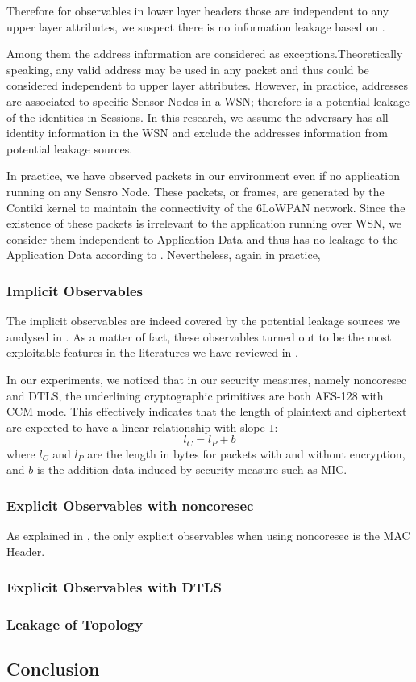 Therefore for observables in lower layer headers those are independent to any upper layer attributes, we suspect there is no information leakage based on .

Among them the address information are considered as exceptions.Theoretically speaking, any valid address may be used in any packet and thus could be considered independent to upper layer attributes. However, in practice, addresses are associated to specific Sensor Nodes in a WSN; therefore is a potential leakage of the identities in Sessions. In this research, we assume the adversary has all identity information in the WSN and exclude the addresses information from potential leakage sources.

In practice, we have observed packets in our environment even if no application running on any Sensro Node. These packets, or frames, are generated by the Contiki kernel to maintain the connectivity of the 6LoWPAN network. Since the existence of these packets is irrelevant to the application running over WSN, we consider them independent to Application Data and thus has no leakage to the Application Data according to . Nevertheless, again in practice, 

\subsubsection{Implicit Observables}

The implicit observables are indeed covered by the potential leakage sources we analysed in . As a matter of fact, these observables turned out to be the most exploitable features in the literatures we have reviewed in .

In our experiments, we noticed that in our security measures, namely noncoresec and DTLS, the underlining cryptographic primitives are both AES-128 with CCM mode. This effectively indicates that the length of plaintext and ciphertext are expected to have a linear relationship with slope $1$:
\begin{equation}
	l_{C} = l_{P} + b
\end{equation}
where $l_{C}$ and $l_{P}$ are the length in bytes for packets with and without encryption, and $b$ is the addition data induced by security measure such as MIC. 

\subsubsection{Explicit Observables with noncoresec}

As explained in , the only explicit observables when using noncoresec is the MAC Header. 

\subsubsection{Explicit Observables with DTLS}


\subsubsection{Leakage of Topology}

\subsection{Conclusion}